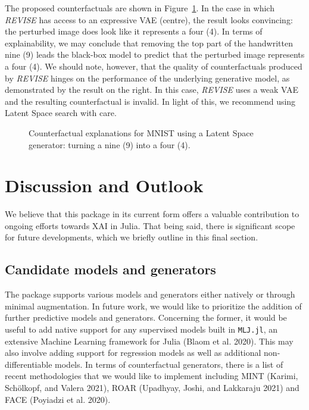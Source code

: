 \documentclass{juliacon}
\begin{document}
The proposed counterfactuals are shown in Figure~\ref{fig-mnist}. In the
case in which \emph{REVISE} has access to an expressive VAE (centre),
the result looks convincing: the perturbed image does look like it
represents a four (4). In terms of explainability, we may conclude that
removing the top part of the handwritten nine (9) leads the black-box
model to predict that the perturbed image represents a four (4). We
should note, however, that the quality of counterfactuals produced by
\emph{REVISE} hinges on the performance of the underlying generative
model, as demonstrated by the result on the right. In this case,
\emph{REVISE} uses a weak VAE and the resulting counterfactual is
invalid. In light of this, we recommend using Latent Space search with
care.

\begin{figure}


\caption{\label{fig-mnist}Counterfactual explanations for MNIST using a
Latent Space generator: turning a nine (9) into a four (4).}

\end{figure}%

\section{Discussion and Outlook}\label{sec-outlook}

We believe that this package in its current form offers a valuable
contribution to ongoing efforts towards XAI in Julia. That being said,
there is significant scope for future developments, which we briefly
outline in this final section.

\subsection{Candidate models and
generators}\label{candidate-models-and-generators}

The package supports various models and generators either natively or
through minimal augmentation. In future work, we would like to
prioritize the addition of further predictive models and generators.
Concerning the former, it would be useful to add native support for any
supervised models built in \texttt{MLJ.jl}, an extensive Machine
Learning framework for Julia (Blaom et al. 2020). This may also involve
adding support for regression models as well as additional
non-differentiable models. In terms of counterfactual generators, there
is a list of recent methodologies that we would like to implement
including MINT (Karimi, Schölkopf, and Valera 2021), ROAR (Upadhyay,
Joshi, and Lakkaraju 2021) and FACE (Poyiadzi et al. 2020).
\end{document}
